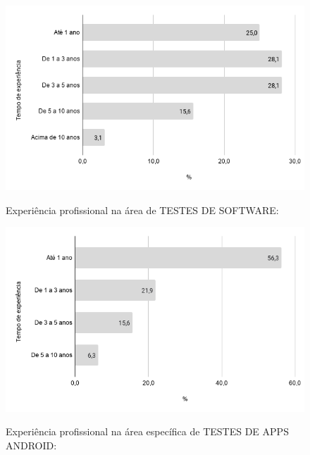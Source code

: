         \begin{figure}[!htb]
        \centering
        \includegraphics[width=.80\textwidth]{images/s_experienciatestes.png}
        \label{figure:s_experienciatestes}
        \caption{Experiência profissional na área de TESTES DE SOFTWARE:}
        \end{figure}
    

        \begin{figure}[!htb]
        \centering
        \includegraphics[width=.80\textwidth]{images/s_experienciatestesandroid.png}
        \label{figure:s_experienciatestesandroid}
        \caption{Experiência profissional na área específica de TESTES DE APPS ANDROID:}
        \end{figure}
    
